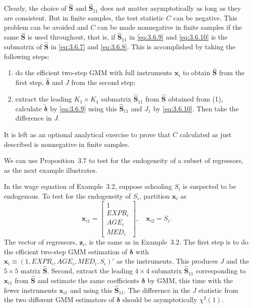 Clearly, the choice of $\hat{\mathbf{S}}$ and $\hat{\mathbf{S}}_{11}$ does not matter asymptotically as long
as they are consistent.  But in finite samples, the test statistic $C$ can be negative.  This
problem can be avoided and $C$ can be made nonnegative in finite samples if the same
$\hat{\mathbf{S}}$ is used throughout, that is, if $\hat{\mathbf{S}}_{11}$ in \eqref{eq:3.6.9} and
\eqref{eq:3.6.10} is the submatrix of $\hat{\mathbf{S}}$ in \eqref{eq:3.6.7} and \eqref{eq:3.6.8}.
This is accomplished by taking the following steps:

\begin{enumerate}
\item[(1)] do the efficient two-step GMM with full instruments $\mathbf{x}_i$ to obtain
  $\hat{\mathbf{S}}$ from the first step, $\hat{\boldsymbol{\delta}}$ and $J$ from the second step;

\item[(2)] extract the leading $K_1 \times K_1$ submatrix $\hat{\mathbf{S}}_{11}$ from $\hat{\mathbf{S}}$
  obtained from (1), calculate $\tilde{\boldsymbol{\delta}}$ by \eqref{eq:3.6.9} using this
  $\hat{\mathbf{S}}_{11}$ and $J_1$ by \eqref{eq:3.6.10}.  Then take the difference in $J$.
\end{enumerate}

It is left as an optional analytical exercise to prove that $C$ calculated as just described
is nonnegative in finite samples.

We can use Proposition~3.7 to test for the endogeneity of a subset of regressors,
as the next example illustrates.

\begin{example}
\label{ex:3.3}
In the wage equation of Example~3.2, suppose schooling $S_i$ is
suspected to be endogenous.  To test for the endogeneity of $S_i$, partition $\mathbf{x}_i$ as
\[
  \mathbf{x}_{i1} = \begin{bmatrix} 1 \\ \mathit{EXPR}_i \\ \mathit{AGE}_i \\
  \mathit{MED}_i \end{bmatrix}, \quad
  \mathbf{x}_{i2} = S_i.
\]
The vector of regressors, $\mathbf{z}_i$, is the same as in Example~3.2.  The first step is to
do the efficient two-step GMM estimation of $\boldsymbol{\delta}$ with
$\mathbf{x}_i \equiv (1, \mathit{EXPR}_i, \mathit{AGE}_i, \mathit{MED}_i, S_i)'$ as the instruments.
This produces $J$ and the $5 \times 5$ matrix $\hat{\mathbf{S}}$.
Second, extract the leading $4 \times 4$ submatrix $\hat{\mathbf{S}}_{11}$ corresponding to
$\mathbf{x}_{i1}$ from $\hat{\mathbf{S}}$ and estimate the same coefficients $\boldsymbol{\delta}$ by GMM, this
time with the fewer instruments $\mathbf{x}_{i1}$ and using this $\hat{\mathbf{S}}_{11}$.  The difference
in the $J$ statistic from the two different GMM estimators of $\boldsymbol{\delta}$ should be
asymptotically $\chi^2(1)$.
\end{example}

